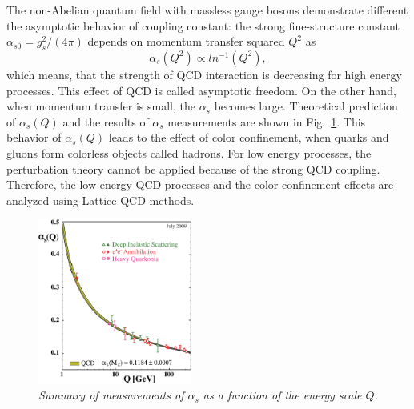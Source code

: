The non-Abelian quantum field with massless gauge bosons demonstrate different the asymptotic behavior of coupling constant: the strong fine-structure constant $\alpha_{s0} = g_s^2/(4\pi)$ depends on momentum transfer squared $Q^2$ as 
\begin{equation}
\alpha_{s}(Q^2) \propto ln^{-1}(Q^2),
\end{equation}
which means, that the strength of QCD interaction is decreasing for high energy processes. This effect of QCD is called asymptotic freedom. On the other hand, when momentum transfer is small, the $\alpha_{s}$ becomes large. Theoretical prediction of $\alpha_s(Q)$ and the results of $\alpha_s$ measurements are shown in Fig.~\ref{fig:alpha_s}. This behavior of $\alpha_s(Q)$ leads to the effect of color confinement, when quarks and gluons form colorless objects called hadrons. For low energy processes, the perturbation theory cannot be applied because of the strong QCD coupling. Therefore, the low-energy QCD processes and the color confinement effects are analyzed using Lattice QCD methods. 
\begin{figure}[h]
{\centering
    \includegraphics[width=0.45\textwidth]{graphics/asq-2009.eps}
    \caption{\sl Summary of measurements of $\alpha_s$ as a function of the energy scale $Q$.\cite{bib:alpha_s}}
    \label{fig:alpha_s}
  }
\end{figure}



